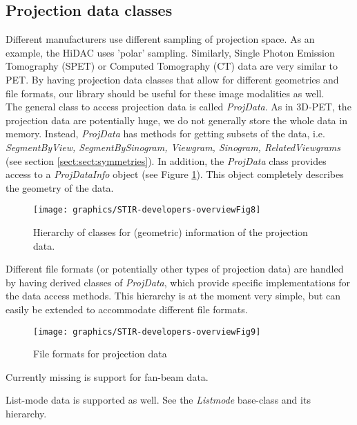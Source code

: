 \documentclass{article}
\begin{document}
\subsection{
Projection data classes}

Different manufacturers use different sampling of projection 
space. As an example, the HiDAC uses 'polar' sampling. Similarly, 
Single Photon Emission Tomography (SPET) or Computed Tomography 
(CT) data are very similar to PET. By having projection data 
classes that allow for different geometries and file formats, 
our library should be useful for these image modalities as well.\\
The general class to access projection data is called \textit{ProjData}. 
As in 3D-PET, the projection data are potentially huge, we do 
not generally store the whole data in memory. Instead, \textit{ProjData} 
has methods for getting subsets of the data, i.e. \textit{SegmentByView, 
SegmentBySinogram, Viewgram, Sinogram, RelatedViewgrams} (see section 
\ref{sect:sect:symmetries}). 
In addition, the \textit{ProjData} class provides access to a \textit{ProjDataInfo} 
object (see Figure \ref{projdatainfo-hierarchy}). This object completely describes the 
geometry of the data.

\begin{figure}[htbp]
\begin{center}
\texttt{[image: graphics/STIR-developers-overviewFig8]}
\caption{ Hierarchy of classes for (geometric) information 
of the projection data.}
\label{projdatainfo-hierarchy}
\end{center}
\end{figure}


Different file formats (or potentially other types of projection 
data) are handled by having derived classes of \textit{ProjData}, 
which provide specific implementations for the data access methods. 
This hierarchy is at the moment very simple, but can easily be 
extended to accommodate different file formats.

\begin{figure}[htbp]
\begin{center}
\texttt{[image: graphics/STIR-developers-overviewFig9]}
\caption{ File formats for projection data}
\end{center}
\end{figure}


Currently missing is support for fan-beam data.

List-mode data is supported as well. See the \textit{Listmode} base-class and its hierarchy.
\end{document}
